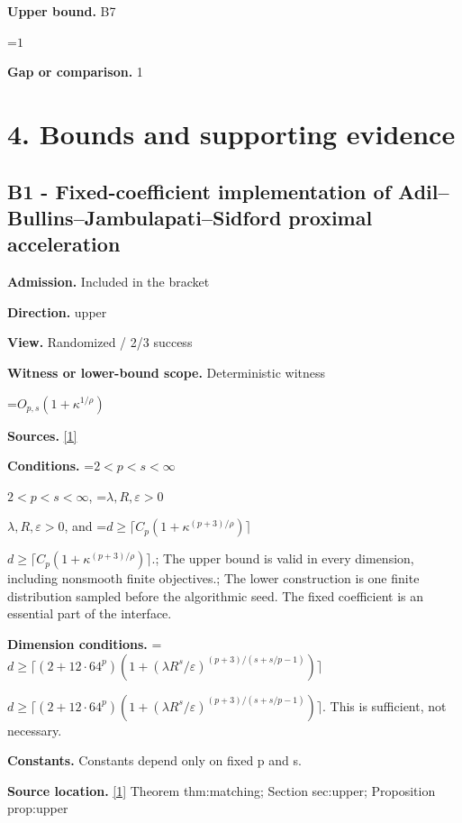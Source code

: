 \documentclass[10pt,a4paper]{article}
\newcommand{\AtlasMath}[1]{\par\begingroup\centering\setbox0=\hbox{$\displaystyle #1$}\ifdim\wd0>1.4\linewidth\typeout{ATLAS WIDE FORMULA: \the\wd0}\fi\ifdim\wd0>\linewidth\resizebox{\linewidth}{!}{\box0}\else\box0\fi\par\endgroup}
\newcommand{\AtlasInlineMath}[1]{\begingroup\setbox0=\hbox{$#1$}\ifdim\wd0>.4\linewidth\endgroup\AtlasMath{#1}\else\endgroup$#1$\fi}
\begin{document}
\textbf{Upper bound.} B7



\AtlasMath{1}


\textbf{Gap or comparison.} 1



\section{4. Bounds and supporting evidence}


\subsection{B1 - Fixed-coefficient implementation of Adil--Bullins--Jambulapati--Sidford proximal acceleration}


\textbf{Admission.} Included in the bracket



\textbf{Direction.} upper



\textbf{View.} Randomized / 2/3 success



\textbf{Witness or lower-bound scope.} Deterministic witness



\AtlasMath{O_{p,s}(1+\kappa^{1/\rho})}


\textbf{Sources.} \href{https://github.com/WU-Wendao/Colombo/blob/main/colombo_sensorium/Complexity_altas/data/sources/colombo/B2/manuscript.pdf}{[1]}



\textbf{Conditions.} \AtlasInlineMath{2<p<s<\infty}, \AtlasInlineMath{\lambda,R,\varepsilon>0}, and \AtlasInlineMath{d\ge\lceil C_p(1+\kappa^{(p+3)/\rho})\rceil}.; The upper bound is valid in every dimension, including nonsmooth finite objectives.; The lower construction is one finite distribution sampled before the algorithmic seed. The fixed coefficient is an essential part of the interface.



\textbf{Dimension conditions.} \AtlasInlineMath{d\ge\lceil(2+12\cdot64^p)(1+(\lambda R^s/\varepsilon)^{(p+3)/(s+s/p-1)})\rceil}. This is sufficient, not necessary.



\textbf{Constants.} Constants depend only on fixed p and s.



\textbf{Source location.} \href{https://github.com/WU-Wendao/Colombo/blob/main/colombo_sensorium/Complexity_altas/data/sources/colombo/B2/manuscript.pdf}{[1]} Theorem thm:matching; Section sec:upper; Proposition prop:upper
\end{document}
